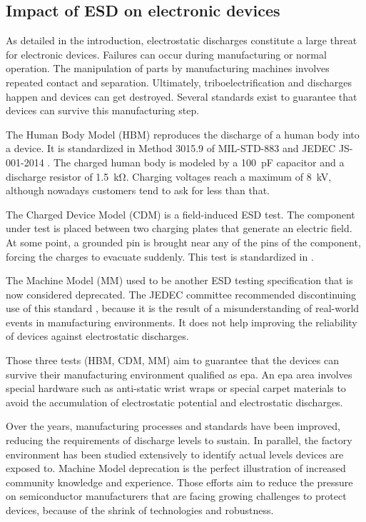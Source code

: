\subsection{Impact of ESD on electronic devices}

As detailed in the introduction, electrostatic discharges constitute a large threat for electronic devices.
Failures can occur during manufacturing or normal operation.
The manipulation of parts by manufacturing machines involves repeated contact and separation.
Ultimately, triboelectrification and discharges happen and devices can get destroyed.
Several standards exist to guarantee that devices can survive this manufacturing step.

The Human Body Model (HBM) reproduces the discharge of a human body into a device.
It is standardized in Method 3015.9 of MIL-STD-883 \cite{MIL-STD-883} and JEDEC JS-001-2014 \cite{jedec-001}.
The charged human body is modeled by a \SI{100}{\pico\farad} capacitor and a discharge resistor of \SI{1.5}{\kilo\ohm}.
Charging voltages reach a maximum of \SI{8}{\kilo\volt}, although nowadays customers tend to ask for less than that.

The Charged Device Model (CDM) is a field-induced ESD test.
The component under test is placed between two charging plates that generate an electric field.
At some point, a grounded pin is brought near any of the pins of the component, forcing the charges to evacuate suddenly.
This test is standardized in \cite{jedec-002}.

The Machine Model (MM) used to be another ESD testing specification that is now considered deprecated.
The JEDEC committee recommended discontinuing use of this standard \cite{discontinued-mm}, because it is the result of a misunderstanding of real-world events in manufacturing environments.
It does not help improving the reliability of devices against electrostatic discharges.

Those three tests (HBM, CDM, MM) aim to guarantee that the devices can survive their manufacturing environment qualified as \gls{epa}.
An \gls{epa} area involves special hardware such as anti-static wrist wraps or special carpet materials to avoid the accumulation of electrostatic potential and electrostatic discharges.

%
Over the years, manufacturing processes and standards have been improved, reducing the requirements of discharge levels to sustain.
In parallel, the factory environment has been studied extensively to identify actual levels devices are exposed to.
Machine Model deprecation is the perfect illustration of increased community knowledge and experience.
Those efforts aim to reduce the pressure on semiconductor manufacturers that are facing growing challenges to protect devices, because of the shrink of technologies and robustness.

